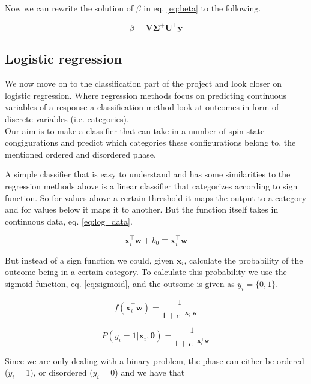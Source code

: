 \documentclass[a4paper,12pt, english]{article}
\begin{document}
Now we can rewrite the solution of $\beta$ in eq. \ref{eq:beta} to the following.

\begin{equation*}
\beta = \mathbf{V} \mathbf{\Sigma}^+ \mathbf{U}^\top \mathbf{y}
\end{equation*}

\subsection{Logistic regression}

We now move on to the classification part of the project and look closer on logistic regression. Where regression methods focus on predicting continuous variables of a response a classification method look at outcomes in form of discrete variables (i.e. categories).  \\
Our aim is to make a classifier that can take in a number of spin-state congigurations and predict which categories these configurations belong to, the mentioned ordered and disordered phase.

A simple classifier that is easy to understand and has some similarities to the regression methods above is a linear classifier that categorizes according to sign function. So for values above a certain threshold it maps the output to a category and for values below it maps it to another. But the function itself takes in continuous data, eq. \ref{eq:log_data}.

\begin{equation} \label{eq:log_data}
\mathbf{x}_i^{\top} \mathbf{w} + b_0 \equiv \mathbf{x}_i^{\top} \mathbf{w} 
\end{equation}

But instead of a sign function we could, given $\mathbf{x}_i$, calculate the probability of the outcome being in a certain category. To calculate this probability we use the sigmoid function, eq. \ref{eq:sigmoid}, and the outsome is given as $y_i = \{0,1\}$.

\begin{equation} \label{eq:sigmoid}
f(\mathbf{x}_i^{\top} \mathbf{w}) = \frac{1}{1 + e^{-\mathbf{x}_i^{\top} \mathbf{w}}}
\end{equation} 

\begin{equation*}
P(y_i = 1|\mathbf{x}_i,\mathbf{\theta}) = \frac{1}{1 + e^{-\mathbf{x}_i^{\top} \mathbf{w}}}
\end{equation*}

Since we are only dealing with a binary problem, the phase can either be ordered ($y_i = 1$), or disordered ($y_i = 0$) and we have that 
\end{document}
